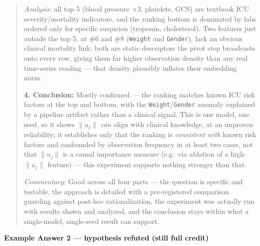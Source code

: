 \documentclass{article}
\begin{document}
\begin{quote}
\emph{Analysis:} all top 5 (blood pressure ×3, platelets, GCS) are textbook ICU severity/mortality indicators, and the ranking bottom is dominated by labs ordered only for specific suspicion (troponin, cholesterol). Two features just outside the top 5, at \#6 and \#8 (\texttt{Weight} and \texttt{Gender}), lack an obvious clinical mortality link; both are static descriptors the pivot step broadcasts onto every row, giving them far higher observation density than any real time-series reading --- that density plausibly inflates their embedding norm.

\textbf{4. Conclusion:} Mostly confirmed --- the ranking matches known ICU risk factors at the top and bottom, with the \texttt{Weight}/\texttt{Gender} anomaly explained by a pipeline artifact rather than a clinical signal. This is one model, one seed, so it shows $\|u_j\|$ \emph{can} align with clinical knowledge, at an unproven reliability; it establishes only that the ranking is \emph{consistent with} known risk factors and confounded by observation frequency in at least two cases, not that $\|u_j\|$ is a causal importance measure (e.g.\ via ablation of a high-$\|u_j\|$ feature) --- this experiment supports nothing stronger than that.

\emph{Commentary:} Good across all four parts --- the question is specific and testable, the approach is detailed with a pre-registered comparison guarding against post-hoc rationalization, the experiment was actually run with results shown and analyzed, and the conclusion stays within what a single-model, single-seed result can support.
\end{quote}

\bigskip
\noindent\textbf{Example Answer 2 --- hypothesis refuted (still full credit)}
\end{document}
